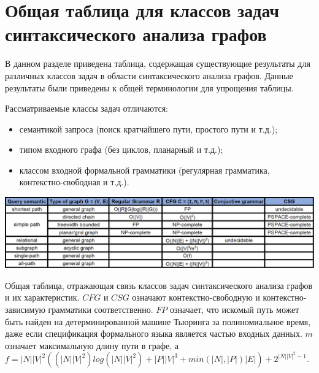 \clearpage
\setmonofont[Mapping=tex-text]{CMU Typewriter Text}
\section{Общая таблица для классов задач синтаксического анализа графов}

В данном разделе приведена таблица, содержащая существующие результаты для различных классов задач в области синтаксического анализа графов. Данные результаты были приведены к общей терминологии для упрощения таблицы.

Рассматриваемые классы задач отличаются:
\begin{itemize}
    \item семантикой запроса (поиск кратчайшего пути, простого пути и т.д.);
    \item типом входного графа (без циклов, планарный и т.д.);
    \item классом входной формальной грамматики (регулярная грамматика, контекстно-свободная и т.д.).
\end{itemize}

\begin{table}[h!]
 \centering
 \includegraphics[width=17cm]{pictures/table_short.png}
 \caption{Общая таблица, отражающая связь классов задач синтаксического анализа графов и их характеристик. $CFG$ и $CSG$ означают контекстно-свободную и контекстно-зависимую грамматики соответственно. $FP$ означает, что искомый путь может быть найден на детерминированной машине Тьюринга за полиномиальное время, даже если спецификация формального языка является частью входных данных. $m$ означает максимальную длину пути в графе, а $f = |N||V|^{2}((|N||V|^{2}) log(|N||V|^{2}) + |P||V|^{3} + min(|N|,|P|) |E|) + 2^{|N||V|^{2} - 1}$.}
 \label{table}
\end{table}